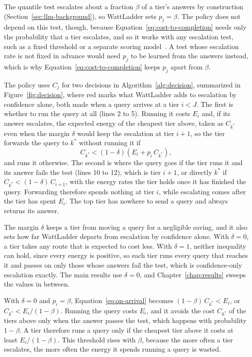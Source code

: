 \documentclass[cic,dipl,english]{infufrgs}
\begin{document}
The quantile test escalates about a fraction $\beta$ of a tier's answers by construction
(Section~\ref{sec:llm-background}), so WattLadder sets $p_j = \beta$. The policy does not
depend on this test, though, because Equation~\eqref{eq:cost-to-completion} needs only
the probability that a tier escalates, and so it works with any escalation test, such as
a fixed threshold or a separate scoring model~\cite{chen2024frugalgpt}. A test whose escalation
rate is not fixed in advance would need $p_j$ to be learned from the answers instead, which is
why Equation~\eqref{eq:cost-to-completion} keeps $p_j$ apart from $\beta$.

The policy uses $C_j$ for two decisions in Algorithm~\ref{alg:decision}, summarized in
Figure~\ref{fig:decision}, where red marks what WattLadder adds to escalation by confidence
alone, both made when a
query arrives at a tier $i < J$. The first is whether to run the query at all (lines 2
to 5). Running it costs $E_i$ and, if its answer escalates, the expected energy of the
cheapest tier above, taken as $C_{k^*}$ even when the margin $\delta$ would keep the escalation
at tier $i+1$, so the tier forwards the query to $k^*$ without running it if
\begin{equation}
  C_{k^*} < (1-\delta)\left(E_i + p_i \, C_{k^*}\right),
  \label{eq:on-arrival}
\end{equation}
and runs it otherwise. The second is where the query goes if the tier runs it and its
answer fails the test (lines 10 to 12), which is tier $i+1$, or directly $k^*$ if
$C_{k^*} < (1-\delta)\,C_{i+1}$, with the energy rates the tier holds once it has finished the
query. Forwarding therefore spends nothing at tier $i$, while
escalating comes after the tier has spent $E_i$. The top tier has nowhere to send a query and
always returns its answer.

The margin $\delta$ keeps a tier from moving a query for a negligible saving, and it also
sets how far WattLadder departs from escalation by confidence alone. With $\delta = 0$, a
tier takes any route that is expected to cost less. With $\delta = 1$, neither
inequality can hold, since every energy is positive, so each tier runs every query that
reaches it and passes on only those whose answers fail the test, which is confidence-only
escalation exactly. The main results use $\delta = 0$, and Chapter~\ref{chap:results}
sweeps the values in between.

With $\delta = 0$ and $p_i = \beta$, Equation~\eqref{eq:on-arrival} becomes
$(1-\beta)\,C_{k^*} < E_i$, or $C_{k^*} < E_i / (1-\beta)$. Running the query costs
$E_i$, and it avoids the cost $C_{k^*}$ of the tiers above only when the answer passes
the test, which happens with probability $1-\beta$. A tier therefore runs a query only
if the cheapest tier above it costs at least $E_i/(1-\beta)$. This threshold rises with
$\beta$, because the more often a tier escalates, the more often the energy it spends
running a query is wasted.
\end{document}
